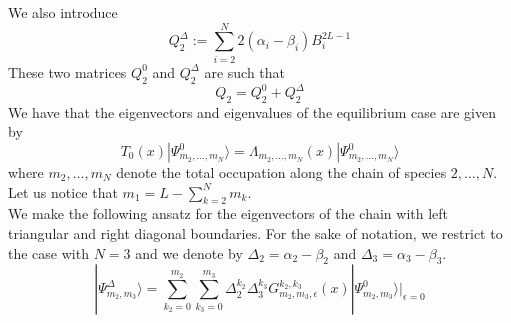 \documentclass[11pt]{article}
\numberwithin{equation}{section}
\numberwithin{equation}{subsection}
\begin{document}
We also introduce 
\begin{equation}
Q_{2}^{\Delta}:=\sum_{i=2}^{N}2(\alpha_{i}-\beta_{i})B_{i}^{2L-1}
\end{equation}
These two matrices $Q_{2}^{0}$ and $Q_{2}^{\Delta}$ are such that
\begin{equation}
Q_{2}=Q_{2}^{0}+Q_{2}^{\Delta}
\end{equation}
We have that the eigenvectors and eigenvalues of the equilibrium case are given by
\begin{equation}
T_{0}(x)|\Psi_{m_{2},\ldots,m_{N}}^{0}\rangle =\Lambda_{m_{2},\ldots,m_{N}}(x)|\Psi_{m_{2},\ldots,m_{N}}^{0}\rangle
\end{equation}
where $m_{2},\ldots,m_{N}$ denote the total occupation along the chain of species $2,\ldots,N$. Let us notice that $m_{1}=L-\sum_{k=2}^{N}m_{k}$.\\
We make the following ansatz for the eigenvectors of the chain with left triangular and right diagonal boundaries. For the sake of notation, we restrict to the case with $N=3$ and we denote by $\Delta_{2}=\alpha_{2}-\beta_{2}$ and $\Delta_{3}=\alpha_{3}-\beta_{3}$.
\begin{equation}
|\Psi_{m_{2},m_{3}}^{\Delta}\rangle=\sum_{k_{2}=0}^{m_{2}}\sum_{k_{3}=0}^{m_{3}}\Delta_{2}^{k_{2}}\Delta_{3}^{k_{3}}G_{m_{2},m_{3},\epsilon}^{k_{2},k_{3}}(x)|\Psi_{m_{2},m_{3}}^{0}\rangle|_{\epsilon=0}
\end{equation}
\end{document}
